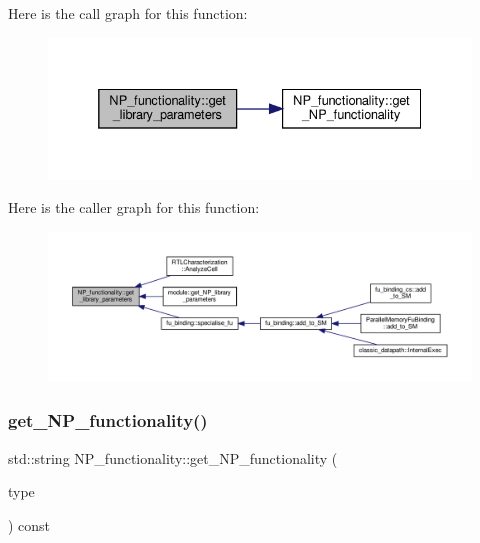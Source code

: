 Here is the call graph for this function\+:
\nopagebreak
\begin{figure}[H]
\begin{center}
\leavevmode
\includegraphics[width=332pt]{d8/dda/classNP__functionality_ae6f15608e45bcf504170ceada6e36d72_cgraph}
\end{center}
\end{figure}
Here is the caller graph for this function\+:
\nopagebreak
\begin{figure}[H]
\begin{center}
\leavevmode
\includegraphics[width=350pt]{d8/dda/classNP__functionality_ae6f15608e45bcf504170ceada6e36d72_icgraph}
\end{center}
\end{figure}
\mbox{\label{classNP__functionality_aabcd7ea1bf14f96b7eeacf7251a68365}} 
\subsubsection{\texorpdfstring{get\+\_\+\+N\+P\+\_\+functionality()}{get\_NP\_functionality()}}
{\footnotesize\ttfamily std\+::string N\+P\+\_\+functionality\+::get\+\_\+\+N\+P\+\_\+functionality (\begin{DoxyParamCaption}\item[{\hyperlink{classNP__functionality_a318d6f254060bfdf145ebeb41efe772e}{N\+P\+\_\+functionaly\+\_\+type}}]{type }\end{DoxyParamCaption}) const}



